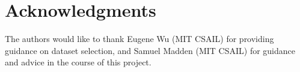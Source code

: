 \section{Acknowledgments}
The authors would like to thank Eugene Wu (MIT CSAIL) for providing guidance on dataset selection, and Samuel Madden (MIT CSAIL) for guidance and advice in the course of this project.
